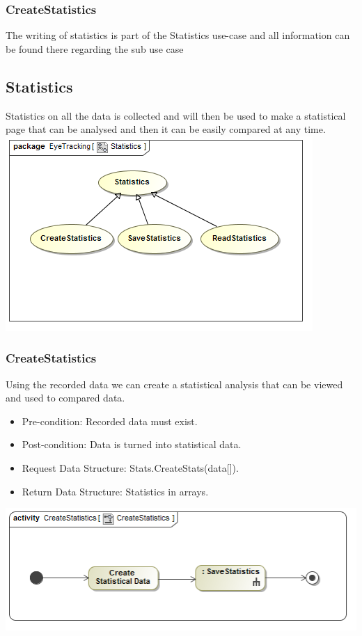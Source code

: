 	\subsubsection{CreateStatistics}
The writing of statistics is part of the Statistics use-case and all information can be found there regarding the sub use case

	
	
\subsection{Statistics}
Statistics on all the data is collected and will then be used to make a statistical page that can be analysed and then it can be easily compared at any time.
\newline
	\includegraphics[scale=0.5]{Diagrams/Use_Case_Diagram__Statistics.png}
	
		\subsubsection{CreateStatistics}
Using the recorded data we can create a statistical analysis that can be viewed and used to compared data.
\begin{itemize}
\item Pre-condition: Recorded data must exist.
\item Post-condition: Data is turned into statistical data.
\item Request Data Structure: Stats.CreateStats(data[]).
\item Return Data Structure: Statistics in arrays.
\end{itemize}

\includegraphics[scale=0.5]{Diagrams/Activity_Diagram__CreateStatistics__CreateStatistics.png}

